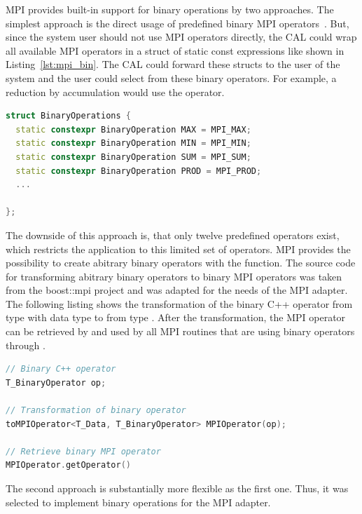 MPI provides built-in support for binary operations by two
approaches. The simplest approach is the direct usage of predefined
binary MPI operators~\cite{ref:mpi_bin_op}. But, since the system user
should not use MPI operators directly, the CAL could wrap all
available MPI operators in a struct of static const expressions like
shown in Listing~\ref{lst:mpi_bin}.  The CAL could forward these
structs to the user of the system and the user could select from these
binary operators.  For example, a reduction by accumulation would use
the  operator.

\begin{lstlisting}[language=C++, caption={A small collection of binary operators derived by transforming MPI operations to static constexpression}, label=lst:mpi_bin]
struct BinaryOperations { 
  static constexpr BinaryOperation MAX = MPI_MAX; 
  static constexpr BinaryOperation MIN = MPI_MIN; 
  static constexpr BinaryOperation SUM = MPI_SUM; 
  static constexpr BinaryOperation PROD = MPI_PROD; 
  ...

};
\end{lstlisting}


\noindent The downside of this approach is, that only twelve predefined
operators exist, which restricts the application to this limited set of
operators. MPI provides the possibility to create abitrary
binary operators with the  function.  The source
code for transforming abitrary binary operators to binary MPI
operators was taken from the boost::mpi project
\cite{ref:boost_mpi} and was adapted for the needs of the MPI adapter.
The following listing shows the transformation of the binary C++
operator  from type  with data type
 to  from type .  After the
transformation, the MPI operator can be retrieved by and used by all
MPI routines that are using binary operators through
.

\begin{lstlisting}[language=C++, caption={ }, label=lst:mpi_bin2]
// Binary C++ operator
T_BinaryOperator op;  
  
// Transformation of binary operator
toMPIOperator<T_Data, T_BinaryOperator> MPIOperator(op);

// Retrieve binary MPI operator
MPIOperator.getOperator()
\end{lstlisting}

\noindent The second approach is substantially more flexible as the
first one. Thus, it was selected to implement binary operations for the
MPI adapter.

